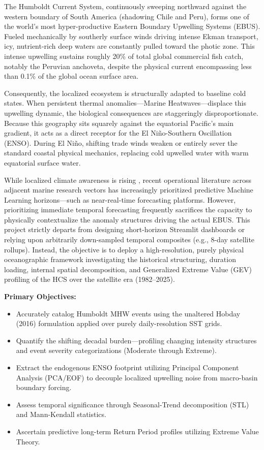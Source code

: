 \documentclass[11pt,a4paper]{article}
\begin{document}
The Humboldt Current System, continuously sweeping northward against the western boundary of South America (shadowing Chile and Peru), forms one of the world's most hyper-productive Eastern Boundary Upwelling Systems (EBUS). Fueled mechanically by southerly surface winds driving intense Ekman transport, icy, nutrient-rich deep waters are constantly pulled toward the photic zone. This intense upwelling sustains roughly 20\% of total global commercial fish catch, notably the Peruvian anchoveta, despite the physical current encompassing less than 0.1\% of the global ocean surface area.

Consequently, the localized ecosystem is structurally adapted to baseline cold states. When persistent thermal anomalies—Marine Heatwaves—displace this upwelling dynamic, the biological consequences are staggeringly disproportionate. Because this geography sits squarely against the equatorial Pacific's main gradient, it acts as a direct receptor for the El Niño-Southern Oscillation (ENSO). During El Niño, shifting trade winds weaken or entirely sever the standard coastal physical mechanics, replacing cold upwelled water with warm equatorial surface water.

While localized climate awareness is rising \cite{hobday2016}, recent operational literature across adjacent marine research vectors has increasingly prioritized predictive Machine Learning horizons—such as near-real-time forecasting platforms. However, prioritizing immediate temporal forecasting frequently sacrifices the capacity to physically contextualize the anomaly structures driving the actual EBUS. This project strictly departs from designing short-horizon Streamlit dashboards or relying upon arbitrarily down-sampled temporal composites (e.g., 8-day satellite rollups). Instead, the objective is to deploy a high-resolution, purely physical oceanographic framework investigating the historical structuring, duration loading, internal spatial decomposition, and Generalized Extreme Value (GEV) profiling of the HCS over the satellite era (1982–2025).

\textbf{Primary Objectives:}
\begin{itemize}[leftmargin=1.5em]
\item Accurately catalog Humboldt MHW events using the unaltered Hobday (2016) formulation applied over purely daily-resolution SST grids.
\item Quantify the shifting decadal burden—profiling changing intensity structures and event severity categorizations (Moderate through Extreme).
\item Extract the endogenous ENSO footprint utilizing Principal Component Analysis (PCA/EOF) to decouple localized upwelling noise from macro-basin boundary forcing.
\item Assess temporal significance through Seasonal-Trend decomposition (STL) and Mann-Kendall statistics.
\item Ascertain predictive long-term Return Period profiles utilizing Extreme Value Theory.
\end{itemize}
\end{document}
